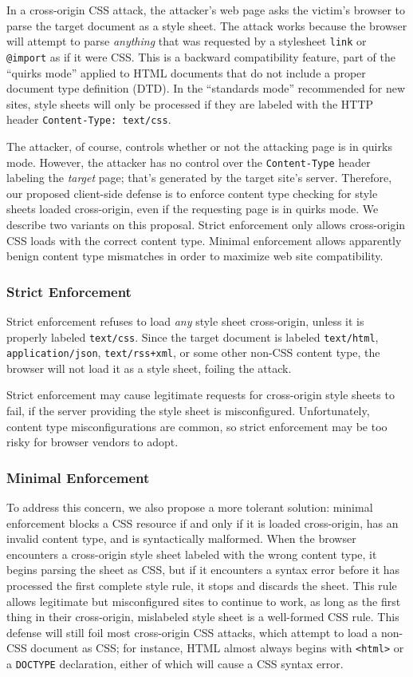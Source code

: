 \documentclass{sig-alternate}
\begin{document}
In a cross-origin CSS attack, the attacker’s web page asks the
victim’s browser to parse the target document as a style sheet.  The
attack works because the browser will attempt to parse \emph{anything}
that was requested by a stylesheet \verb|link| or \verb|@import| as if
it were CSS. This is a backward compatibility feature, part of the
“quirks mode” applied to HTML documents that do not include a proper
document type definition (DTD). In the “standards mode” recommended
for new sites, style sheets will only be processed if they are labeled
with the HTTP header \verb|Content-Type: text/css|.

The attacker, of course, controls whether or not the attacking page is
in quirks mode. However, the attacker has no control over the
\texttt{Content-Type} header labeling the \emph{target} page; that's
generated by the target site's server. Therefore, our proposed
client-side defense is to enforce content type checking for style
sheets loaded cross-origin, even if the requesting page is in quirks
mode. We describe two variants on this proposal.  Strict enforcement
only allows cross-origin CSS loads with the correct content type.
Minimal enforcement allows apparently benign content type mismatches
in order to maximize web site compatibility.

\subsubsection{Strict Enforcement} \label{sec:strict}
Strict enforcement refuses to load \emph{any} style sheet
cross-origin, unless it is properly labeled
\texttt{text\slash{}css}. Since the target document is labeled
\texttt{text\slash{}html}, \texttt{application\slash{}json},
\texttt{text\slash{}rss+xml}, or some other non-CSS content type, the
browser will not load it as a style sheet, foiling the attack.

Strict enforcement may cause legitimate requests for cross-origin
style sheets to fail, if the server providing the style sheet is
misconfigured.  Unfortunately, content type misconfigurations are
common, so strict enforcement may be too risky for browser vendors to
adopt.

\subsubsection{Minimal Enforcement}
To address this concern, we also propose a more tolerant solution:
minimal enforcement blocks a CSS resource if and only if it is loaded
cross-origin, has an invalid content type, and is syntactically
malformed. When the browser encounters a cross-origin style sheet
labeled with the wrong content type, it begins parsing the sheet as
CSS, but if it encounters a syntax error before it has processed the
first complete style rule, it stops and discards the sheet. This rule
allows legitimate but misconfigured sites to continue to work, as long
as the first thing in their cross-origin, mislabeled style sheet is a
well-formed CSS rule. This defense will still foil most cross-origin
CSS attacks, which attempt to load a non-CSS document as CSS; for
instance, HTML almost always begins with \verb|<html>| or a
\verb|DOCTYPE| declaration, either of which will cause a CSS syntax
error.
\end{document}
